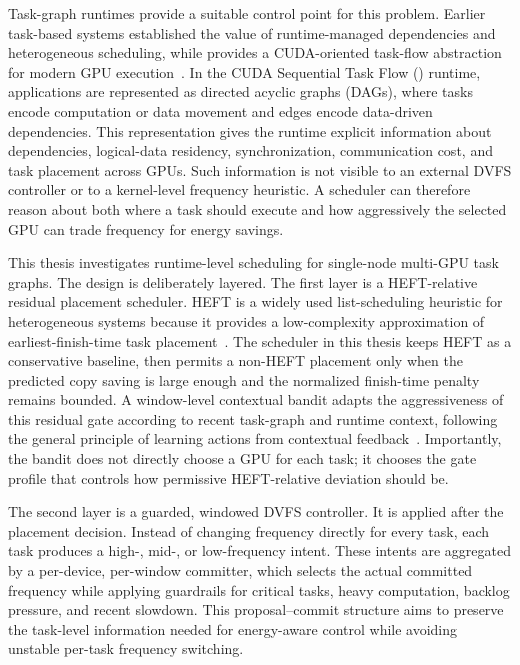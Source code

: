 Task-graph runtimes provide a suitable control point for this problem. Earlier task-based systems established the value of runtime-managed dependencies and heterogeneous scheduling, while \CUDASTF{} provides a CUDA-oriented task-flow abstraction for modern GPU execution~\cite{Augonnet2011StarPU,Augonnet2024CUDASTF}. In the CUDA Sequential Task Flow (\CUDASTF{}) runtime, applications are represented as directed acyclic graphs (DAGs), where tasks encode computation or data movement and edges encode data-driven dependencies. This representation gives the runtime explicit information about dependencies, logical-data residency, synchronization, communication cost, and task placement across GPUs. Such information is not visible to an external DVFS controller or to a kernel-level frequency heuristic. A \CUDASTF{} scheduler can therefore reason about both where a task should execute and how aggressively the selected GPU can trade frequency for energy savings.

This thesis investigates runtime-level scheduling for single-node multi-GPU \CUDASTF{} task graphs. The design is deliberately layered. The first layer is a HEFT-relative residual placement scheduler. HEFT is a widely used list-scheduling heuristic for heterogeneous systems because it provides a low-complexity approximation of earliest-finish-time task placement~\cite{Topcuoglu2002HEFT}. The scheduler in this thesis keeps HEFT as a conservative baseline, then permits a non-HEFT placement only when the predicted copy saving is large enough and the normalized finish-time penalty remains bounded. A window-level contextual bandit adapts the aggressiveness of this residual gate according to recent task-graph and runtime context, following the general principle of learning actions from contextual feedback~\cite{Li2010ContextualBandit}. Importantly, the bandit does not directly choose a GPU for each task; it chooses the gate profile that controls how permissive HEFT-relative deviation should be.

The second layer is a guarded, windowed DVFS controller. It is applied after the placement decision. Instead of changing frequency directly for every task, each task produces a high-, mid-, or low-frequency intent. These intents are aggregated by a per-device, per-window committer, which selects the actual committed frequency while applying guardrails for critical tasks, heavy computation, backlog pressure, and recent slowdown. This proposal--commit structure aims to preserve the task-level information needed for energy-aware control while avoiding unstable per-task frequency switching.


